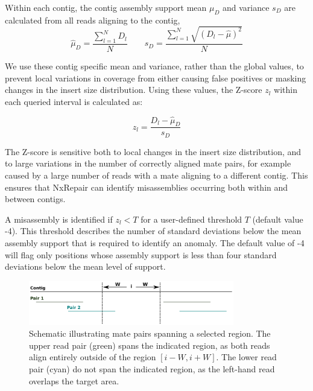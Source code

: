Within each contig, the contig assembly support mean $\mu_D$ and variance $s_D$ are calculated from all reads aligning to the contig,
\begin{equation}
\hat{\mu}_D = \frac{\sum_{l=1}^N D_l}{N} \qquad s_D = \frac{\sum_{l=1}^N \sqrt{(D_l - \hat{\mu})^2}}{N}
\label{eq:contigD}
\end{equation}

We use these contig specific mean and variance, rather than the global values, to prevent local variations in coverage from either causing false positives or masking changes in the insert size distribution. Using these values, the Z-score $z_l$ within each queried interval is calculated as: 

\begin{equation}
z_l = \frac{D_l - \hat{\mu}_D}{s_D}
\label{eq:zscore}
\end{equation}

The Z-score is sensitive both to local changes in the insert size distribution, and to large variations in the number of correctly aligned mate pairs, for example caused by a large number of reads with a mate aligning to a different contig. This ensures that NxRepair can identify misassemblies occurring both within and between contigs.  

A misassembly is identified if $z_l < T$ for a user-defined threshold $T$ (default value -4). This threshold describes the number of standard deviations below the mean assembly support that is required to identify an anomaly. The default value of -4 will flag only positions whose assembly support is less than four standard deviations below the mean level of support.

\begin{figure}
\centerline{\includegraphics[width=0.8\textwidth]{illumina/spanning.pdf}}
\caption{Schematic illustrating mate pairs spanning a selected region. The upper read pair (green) spans the indicated region, as both reads align entirely outside of the region $[i-W, i+W]$. The lower read pair (cyan) do not span the indicated region, as the left-hand read overlaps the target area. \label{fig:spanning}}
\end{figure}

